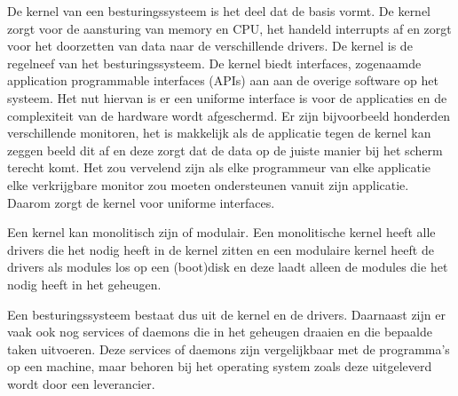 De kernel van een besturingssysteem is het deel dat de basis vormt. De kernel zorgt voor de aansturing van memory en CPU, het handeld interrupts af en zorgt voor het doorzetten van data naar de verschillende drivers. De kernel is de regelneef van het besturingssysteem. De kernel biedt interfaces, zogenaamde application programmable interfaces (APIs) aan aan de overige software op het systeem. Het nut hiervan is er een uniforme interface is voor de applicaties en de complexiteit van de hardware wordt afgeschermd. Er zijn bijvoorbeeld honderden verschillende monitoren, het is makkelijk als de applicatie tegen de kernel kan zeggen beeld dit af en deze zorgt dat de data op de juiste manier bij het scherm terecht komt. Het zou vervelend zijn als elke programmeur van elke applicatie elke verkrijgbare monitor zou moeten ondersteunen vanuit zijn applicatie. Daarom zorgt de kernel voor uniforme interfaces.

Een kernel kan monolitisch zijn of modulair. Een monolitische kernel heeft alle drivers die het nodig heeft in de kernel zitten en een modulaire kernel heeft de drivers als modules los op een (boot)disk en deze laadt alleen de modules die het nodig heeft in het geheugen.

Een besturingssysteem bestaat dus uit de kernel en de drivers. Daarnaast zijn er vaak ook nog services of daemons die in het geheugen draaien en die bepaalde taken uitvoeren. Deze services of daemons zijn vergelijkbaar met de programma's op een machine, maar behoren bij het operating system zoals deze uitgeleverd wordt door een leverancier.

